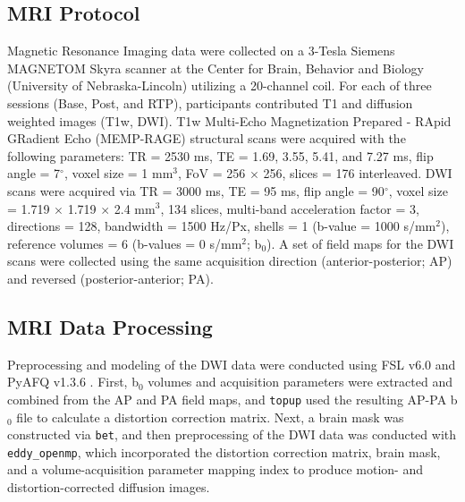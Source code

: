 \documentclass[12pt]{article}
\begin{document}
\subsection{MRI Protocol}
\label{ssec:meth-mri}
Magnetic Resonance Imaging data were collected on a 3-Tesla Siemens MAGNETOM Skyra scanner at the Center for Brain, Behavior and Biology (University of Nebraska-Lincoln) utilizing a 20-channel coil. For each of three sessions (Base, Post, and RTP), participants contributed T1 and diffusion weighted images (T1w, DWI). T1w Multi-Echo Magnetization Prepared - RApid GRadient Echo (MEMP-RAGE) structural scans were acquired with the following parameters: TR = 2530 ms, TE = 1.69, 3.55, 5.41, and 7.27 ms, flip angle = 7$^{\circ}$, voxel size = 1 mm$^3$, FoV = 256 $\times$ 256, slices = 176 interleaved. DWI scans were acquired via TR = 3000 ms, TE = 95 ms, flip angle = 90$^{\circ}$, voxel size = 1.719 $\times$ 1.719 $\times$ 2.4 mm$^3$, 134 slices, multi-band acceleration factor = 3, directions = 128, bandwidth = 1500 Hz/Px, shells = 1 (b-value = 1000 s/mm$^2$), reference volumes = 6 (b-values = 0 s/mm$^2$; b$_0$). A set of field maps for the DWI scans were collected using the same acquisition direction (anterior-posterior; AP) and reversed (posterior-anterior; PA).


\subsection{MRI Data Processing}
\label{ssec:meth-mri-proc}
Preprocessing and modeling of the DWI data were conducted using FSL v6.0 \parencite{jenkinson2012Fsl} and PyAFQ v1.3.6 \parencite{kruper2021EvaluatingReliabilityHuman,yeatman2012TractProfilesWhite}. First, b$_0$ volumes and acquisition parameters were extracted and combined from the AP and PA field maps, and \lstinline{topup} used the resulting AP-PA b$_0$ file to calculate a distortion correction matrix. Next, a brain mask was constructed via \lstinline{bet}, and then preprocessing of the DWI data was conducted with \lstinline{eddy_openmp}, which incorporated the distortion correction matrix, brain mask, and a volume-acquisition parameter mapping index to produce motion- and distortion-corrected diffusion images.
\end{document}
